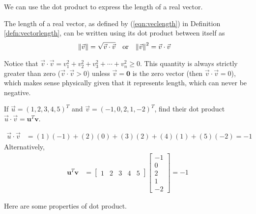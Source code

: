 We can use the dot product to express the length of a real vector.
\begin{proper}
\label{proper:lengthdot}
The length of a real vector, as defined by (\ref{eqn:veclength}) in Definition \ref{defn:vectorlength}, can be written using its dot product between itself as
\begin{align}
\norm{\vec{v}} &= \sqrt{\vec{v} \cdot \vec{v}} & &\text{or} &
\norm{\vec{v}}^2 &= \vec{v} \cdot \vec{v}
\end{align}
\end{proper}
Notice that $\vec{v} \cdot \vec{v} = v_1^2 + v_2^2 + v_3^2 + \cdots + v_n^2 \geq 0$. This quantity is always strictly greater than zero ($\vec{v} \cdot \vec{v} > 0$) unless $\vec{v} = \textbf{0}$ is the zero vector (then $\vec{v} \cdot \vec{v} = 0$), which makes sense physically given that it represents length, which can never be negative.
\begin{exmp}
\label{exmp:dotproduct5d}
If $\vec{u} = (1, 2, 3, 4, 5)^T$ and $\vec{v} = (-1, 0, 2, 1, -2)^T$, find their dot product $\vec{u} \cdot \vec{v} = \textbf{u}^T\textbf{v}$.
\end{exmp}
\begin{solution}
\begin{align*}
\vec{u} \cdot \vec{v} &= (1)(-1) + (2)(0) + (3)(2) + (4)(1) + (5)(-2) = -1
\end{align*}
Alternatively,
\begin{align*}
\textbf{u}^T\textbf{v} &=
\begin{bmatrix}
1 & 2 & 3 & 4 & 5
\end{bmatrix}
\begin{bmatrix}
-1 \\
0 \\
2 \\
1 \\
-2
\end{bmatrix}
= -1
\end{align*}
\end{solution}
Here are some properties of dot product.

